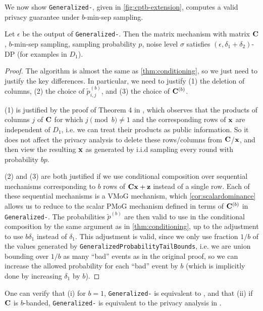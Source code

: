 We now show \texttt{Generalized-}\MMCC{}, given in \cref{fig:cptb-extension}, computes a valid privacy guarantee under $b$-min-sep sampling.

\begin{thm}\label{thm:mmcc-generalization}
Let $\epsilon$ be the output of \texttt{Generalized-}\MMCC{}. Then the matrix mechanism with matrix $\mathbf{C}$, $b$-min-sep sampling, sampling probability $p$, noise level $\sigma$ satisfies $(\epsilon, \delta_1 + \delta_2)$-DP (for examples in $D_1$).
\end{thm}
\begin{proof}
The algorithm is almost the same as \cref{thm:conditioning}, so we just need to justify the key differences. In particular, we need to justify (1) the deletion of columns, (2) the choice of $\tilde{p}^{(b)}_{i,j}$, and (3) the choice of $\mathbf{C}^{(b)}$.

(1) is justified by the proof of Theorem 4 in \cite{BandedMF}, which observes that the products of columns $j$ of $\mathbf{C}$ for which $j \pmod b \neq 1$ and the corresponding rows of $\mathbf{x}$ are independent of $D_1$, i.e. we can treat their products as public information. So it does not affect the privacy analysis to delete these rows/columns from $\mathbf{C}$/$\mathbf{x}$, and then view the resulting $\mathbf{x}$ as generated by i.i.d sampling every round with probability $bp$.

(2) and (3) are both justified if we use conditional composition over  sequential mechanisms corresponding to $b$ rows of $\mathbf{C} \mathbf{x} + \mathbf{z}$ instead of a single row. Each of these sequential mechanisms is a VMoG mechanism, which \cref{cor:scalardominance} allows us to reduce to the scalar PMoG mechanism defined in terms of $\mathbf{C}^{(b)}$ in \texttt{Generalized-}\MMCC{}. The probabilities $\tilde{p}^{(b)}$ are then valid to use in the conditional composition by the same argument as in \cref{thm:conditioning}, up to the adjustment to use $b \delta_1$ instead of $\delta_1$. This adjustment is valid, since we only use fraction $1/b$ of the values generated by \texttt{GeneralizedProbabilityTailBounds}, i.e. we are union bounding over $1/b$ as many ``bad'' events as in the original proof, so we can increase the allowed probability for each ``bad'' event by $b$ (which is implicitly done by increasing $\delta_1$ by $b$).
\end{proof}

One can verify that (i) for $b = 1$, \texttt{Generalized-}\MMCC{} is equivalent to \MMCC{}, and that (ii) if $\mathbf{C}$ is $b$-banded, \texttt{Generalized-}\MMCC{} is equivalent to the privacy analysis in \cite{BandedMF}.